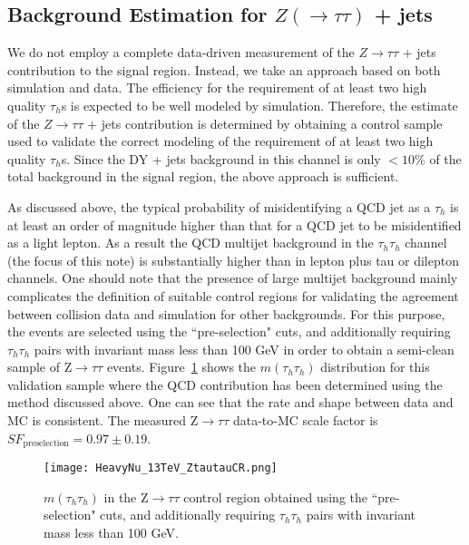 \subsection{\texorpdfstring{Background Estimation for $Z (\rightarrow \tau\tau)$ + jets}{Background Estimation for Z (to tau tau) + jets}}

We do not employ a complete data-driven measurement of the $Z\to\tau\tau$ + jets contribution to the signal region. Instead, we take an approach based on
both simulation and data. The efficiency for the requirement of at least two high quality $\tau_{h}$s is expected to be well modeled by simulation. 
Therefore, the estimate of the $Z\to\tau\tau$ + jets contribution is determined by obtaining a control sample used to validate the 
correct modeling of the requirement of at least two high quality $\tau_{h}$s. 
Since the DY + jets background in this channel is only 
$< 10$\% of the total background in the signal region, the above approach is sufficient. 

As discussed above, the typical probability of misidentifying a QCD jet as a $\tau_{h}$ is at least
an order of magnitude higher than that for a QCD jet to be misidentified as a light lepton. As a
result the QCD multijet background in the $\tau_{h}\tau_{h}$ channel (the focus of this note) is substantially higher
than in lepton plus tau or dilepton channels. One should note that the presence
of large multijet background mainly complicates the definition of suitable control regions for
validating the agreement between collision data and simulation for other backgrounds.
For this purpose, the events are selected using the ``pre-selection" cuts, and additionally requiring $\tau_{h}\tau_{h}$ pairs with
invariant mass less than 100 GeV in order to obtain a semi-clean sample of Z$\to\tau\tau$ events. 
Figure~\ref{fig:ZtautauControlDiHad} shows the $m(\tau_{h}\tau_{h})$ distribution for this validation sample where the QCD contribution has been determined using
the method discussed above. One can see that the rate and shape between data and MC is consistent. The measured Z$\to\tau\tau$ data-to-MC scale factor is {\bf 
$SF_{\textrm{preselection}} = 0.97 \pm 0.19$}.

\begin{figure}[tbh!]
  \centering
    \texttt{[image: HeavyNu\_13TeV\_ZtautauCR.png]}
  \caption{ $m(\tau_{h}\tau_{h})$ in the Z$\to\tau\tau$ control region obtained using the ``pre-selection" cuts, and additionally requiring 
$\tau_{h}\tau_{h}$ pairs with invariant mass less than 100 GeV.}
  \label{fig:ZtautauControlDiHad}
\end{figure}
